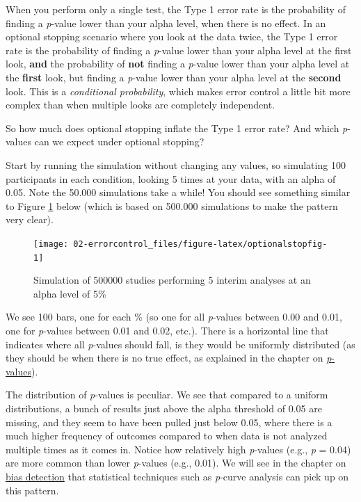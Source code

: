 \documentclass[
  oneside]{book}
\begin{document}
When you perform only a single test, the Type 1 error rate is the probability of finding a \emph{p}-value lower than your alpha level, when there is no effect. In an optional stopping scenario where you look at the data twice, the Type 1 error rate is the probability of finding a \emph{p}-value lower than your alpha level at the first look, \textbf{and} the probability of \textbf{not} finding a \emph{p}-value lower than your alpha level at the \textbf{first} look, but finding a \emph{p}-value lower than your alpha level at the \textbf{second} look. This is a \emph{conditional probability}, which makes error control a little bit more complex than when multiple looks are completely independent.

So how much does optional stopping inflate the Type 1 error rate? And which \emph{p}-values can we expect under optional stopping?

Start by running the simulation without changing any values, so simulating 100 participants in each condition, looking 5 times at your data, with an alpha of 0.05. Note the 50.000 simulations take a while! You should see something similar to Figure \ref{fig:optionalstopfig} below (which is based on 500.000 simulations to make the pattern very clear).



\begin{figure}

{\centering \texttt{[image: 02-errorcontrol\_files/figure-latex/optionalstopfig-1]} 

}

\caption{Simulation of 500000 studies performing 5 interim analyses at an alpha level of 5\%}\label{fig:optionalstopfig}
\end{figure}

We see 100 bars, one for each \% (so one for all \emph{p}-values between 0.00 and 0.01, one for \emph{p}-values between 0.01 and 0.02, etc.). There is a horizontal line that indicates where all \emph{p}-values should fall, is they would be uniformly distributed (as they should be when there is no true effect, as explained in the chapter on \protect\hyperlink{pvalues}{\emph{p}-values}).

The distribution of \emph{p}-values is peculiar. We see that compared to a uniform distributions, a bunch of results just above the alpha threshold of 0.05 are missing, and they seem to have been pulled just below 0.05, where there is a much higher frequency of outcomes compared to when data is not analyzed multiple times as it comes in. Notice how relatively high \emph{p}-values (e.g., \emph{p} = 0.04) are more common than lower \emph{p}-values (e.g., 0.01). We will see in the chapter on \href{bias}{bias detection} that statistical techniques such as \emph{p}-curve analysis can pick up on this pattern.
\end{document}
